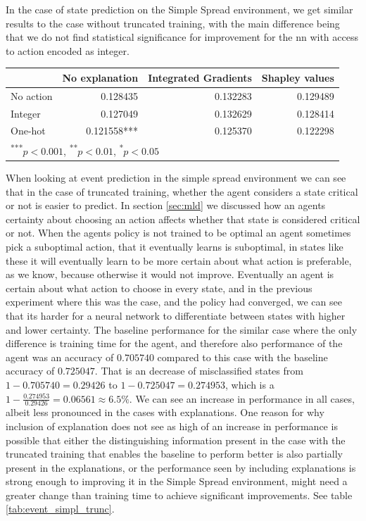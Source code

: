 \documentclass[UKenglish]{uiomasterthesis}
\begin{document}
In the case of state prediction on the Simple Spread environment, we get similar results to the case without truncated training, with the main difference being that we do not find statistical significance for improvement for the \ac{nn} with access to action encoded as integer.

\begin{center}
\label{tab:state_simpl_trunc}
\begin{tabular}{lrrr}
\toprule
& No explanation & Integrated Gradients & Shapley values \\
\midrule
No action & 0.128435 & 0.132283 & 0.129489 \\
Integer & 0.127049 & 0.132629 & 0.128414 \\
One-hot & 0.121558*** & 0.125370 & 0.122298 \\
\bottomrule
\multicolumn{3}{l}{\textsuperscript{***}$p<0.001$, 
  \textsuperscript{**}$p<0.01$, 
  \textsuperscript{*}$p<0.05$}
\end{tabular}
\end{center}


When looking at event prediction in the simple spread environment we can see that in the case of truncated training, whether the agent considers a state critical or not is easier to predict. In section \ref{sec:mld} we discussed how an agents certainty about choosing an action affects whether that state is considered critical or not. When the agents policy is not trained to be optimal an agent sometimes pick a suboptimal action, that it eventually learns is suboptimal, in states like these it will eventually learn to be more certain about what action is preferable, as we know, because otherwise it would not improve. Eventually an agent is certain about what action to choose in every state, and in the previous experiment where this was the case, and the policy had converged, we can see that its harder for a neural network to differentiate between states with higher and lower certainty. The baseline performance for the similar case where the only difference is training time for the agent, and therefore also performance of the agent was an accuracy of $0.705740$ compared to this case with the baseline accuracy of $0.725047$. That is an decrease of misclassified states from $1-0.705740 = 0.29426$ to $1-0.725047 = 0.274953$, which is a $1-\frac{0.274953}{0.29426}=0.06561\approx 6.5\%$. We can see an increase in performance in all cases, albeit less pronounced in the cases with explanations. One reason for why inclusion of explanation does not see as high of an increase in performance is possible that either the distinguishing information present in the case with the truncated training that enables the baseline to perform better is also partially present in the explanations, or the performance seen by including explanations is strong enough to improving it in the Simple Spread environment, might need a greater change than training time to achieve significant improvements. See table \ref{tab:event_simpl_trunc}.
\end{document}
